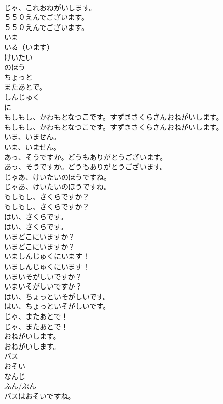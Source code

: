 \documentclass[8pt]{extreport}
\begin{document}
\begin{CJK}{UTF8}{min}
\\	じゃ、これおねがいします。 
\\	５５０えんでございます。	
\\	５５０えんでございます。 
\\	いま
\\	いる（います）
\\	けいたい
\\	のほう
\\	ちょっと
\\	またあとで。
\\	しんじゅく
\\	に
\\	もしもし、かわもとなつこです。すずきさくらさんおねがいします。	
\\	もしもし、かわもとなつこです。すずきさくらさんおねがいします。 
\\	いま、いません。	
\\	いま、いません。 
\\	あっ、そうですか。どうもありがとうございます。	
\\	あっ、そうですか。どうもありがとうございます。 
\\	じゃあ、けいたいのほうですね。	
\\	じゃあ、けいたいのほうですね。 
\\	もしもし、さくらですか？	
\\	もしもし、さくらですか？ 
\\	はい、さくらです。	
\\	はい、さくらです。 
\\	いまどこにいますか？	
\\	いまどこにいますか？ 
\\	いましんじゅくにいます！	
\\	いましんじゅくにいます！ 
\\	いまいそがしいですか？	
\\	いまいそがしいですか？ 
\\	はい、ちょっといそがしいです。	
\\	はい、ちょっといそがしいです。 
\\	じゃ、またあとで！	
\\	じゃ、またあとで！ 
\\	おねがいします。	
\\	おねがいします。 
\\	バス
\\	おそい
\\	なんじ
\\	ふん/ぷん
\\	バスはおそいですね。	

\end{CJK}
\end{document}
